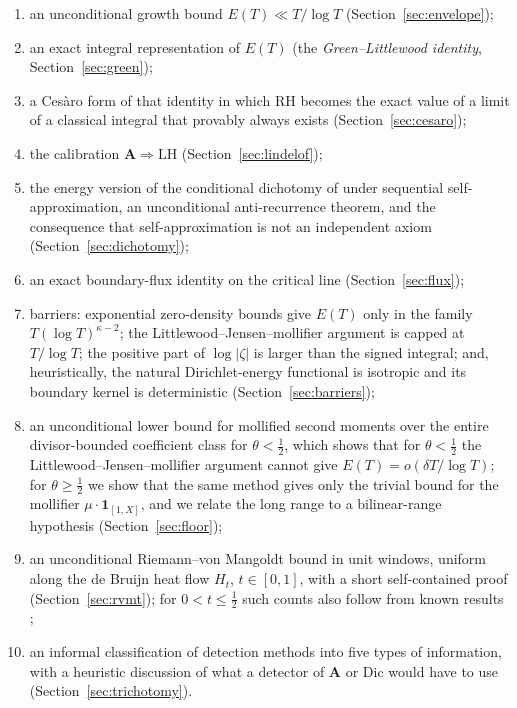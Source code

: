 \documentclass[11pt]{amsart}
\theoremstyle{plain}
\theoremstyle{definition}
\theoremstyle{remark}
\newcommand{\RH}{\mathrm{RH}}
\newcommand{\LH}{\mathrm{LH}}
\newcommand{\Dic}{\mathrm{Dic}}
\newcommand{\Aax}{\mathbf{A}}
\begin{document}
\begin{enumerate}
\item an unconditional growth bound $E(T)\ll T/\log T$ (Section~\ref{sec:envelope});
\item an exact integral representation of $E(T)$ (the \emph{Green--Littlewood identity}, Section~\ref{sec:green});
\item a Ces\`aro form of that identity in which $\RH$ becomes the exact value of a limit of a classical integral that provably always exists (Section~\ref{sec:cesaro});
\item the calibration $\Aax\Rightarrow\LH$ (Section~\ref{sec:lindelof});
\item the energy version of the conditional dichotomy of \cite[Thm.~2.3]{P30} under sequential self-approximation, an unconditional anti-recurrence theorem, and the consequence that self-approximation is not an independent axiom (Section~\ref{sec:dichotomy});
\item an exact boundary-flux identity on the critical line (Section~\ref{sec:flux});
\item barriers: exponential zero-density bounds give $E(T)$ only in the family $T(\log T)^{\kappa-2}$; the Littlewood--Jensen--mollifier argument is capped at $T/\log T$; the positive part of $\log|\zeta|$ is larger than the signed integral; and, heuristically, the natural Dirichlet-energy functional is isotropic and its boundary kernel is deterministic (Section~\ref{sec:barriers});
\item an unconditional lower bound for mollified second moments over the entire divisor-bounded coefficient class for $\theta<\tfrac12$, which shows that for $\theta<\tfrac12$ the Littlewood--Jensen--mollifier argument cannot give $E(T)=o(\delta T/\log T)$; for $\theta\ge\tfrac12$ we show that the same method gives only the trivial bound for the mollifier $\mu\cdot\mathbf 1_{[1,X]}$, and we relate the long range to a bilinear-range hypothesis (Section~\ref{sec:floor});
\item an unconditional Riemann--von Mangoldt bound in unit windows, uniform along the de Bruijn heat flow $H_t$, $t\in[0,1]$, with a short self-contained proof (Section~\ref{sec:rvmt}); for $0<t\le\tfrac12$ such counts also follow from known results \cite{Polymath2019,KiKimLee2009,RodgersTao2020};
\item an informal classification of detection methods into five types of information, with a heuristic discussion of what a detector of $\Aax$ or $\Dic$ would have to use (Section~\ref{sec:trichotomy}).
\end{enumerate}
\end{document}
